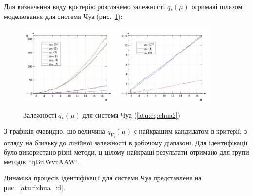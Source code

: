 \documentclass[a4paper,13pt]{atuaref}
\DeclareMathOperator*{\sign}{sign}
\begin{document}
Для визначення виду критерію розглянемо залежності $ q_{*}(\mu)$ отримані
шляхом моделювання для системи Чуа (рис.~\ref{atu:f:chua_q}):

\begin{figure}[htb!]
\centerline{
  \includegraphics[width=0.45\textwidth]{p5/p/cha/chua/chua_q-p_mu2.png}
  \includegraphics[width=0.45\textwidth]{p5/p/cha/chua/chua_q-p_mu1.png}
}
  \caption{Залежності $q_{*}(\mu) $ для системи Чуа (\ref{atu:eq:chua2})}
\label{atu:f:chua_q}
\end{figure}

З графіків очевидно, що величина $ q_{V_1} (\mu) $
є найкращим кандидатом в критерії, з огляду на близьку до лінійної залежності в робочому діапазоні.
%
Для ідентифікації було використано різні методи, ц цілому найкращі результати 
отримано для групи методів ``ql3rlWvnAAW''.

Динаміка процесів ідентифікації для системи Чуа представлена на рис.~\ref{atu:f:chua_id}.
\end{document}
